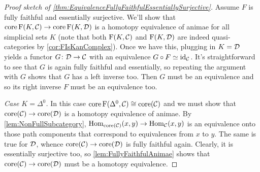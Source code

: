 \begin{proof}[Proof sketch of \cref{thm:EquivalenceFullyFaithfulEssentiallySurjective}]
	Assume $F$ is fully faithful and essentially surjective. We'll show that $\operatorname{core} \operatorname{F}(K,\mathcal{C})\rightarrow\operatorname{core}\operatorname{F}(K,\mathcal{D})$ is a homotopy equivalence of animae for all simplicial sets $K$ (note that both $\operatorname{F}(K,\mathcal{C})$ and $\operatorname{F}(K,\mathcal{D})$ are indeed quasi-categories by \cref{cor:FIsKanComplex}). Once we have this, plugging in $K=\mathcal{D}$ yields a functor $G\colon \mathcal{D}\rightarrow\mathcal{C}$ with an equivalence $G\circ F\simeq\operatorname{id}_{\mathcal{C}}$. It's straightforward to see that $G$ is again fully faithful and essentially, so repeating the argument with $G$ shows that $G$ has a left inverse too. Then $G$ must be an equivalence and so its right inverse $F$ must be an equivalence too.
	
	\emph{Case $K=\Delta^0$.} In this case $\operatorname{core} \operatorname{F}(\Delta^0,\mathcal{C})\cong \operatorname{core}(\mathcal{C})$ and we must show that $\operatorname{core}(\mathcal{C})\rightarrow\operatorname{core}(\mathcal{D})$ is a homotopy equivalence of animae. By \cref{lem:NonFullSubcategory}, $\operatorname{Hom}_{\operatorname{core} (\mathcal{C})}(x,y)\rightarrow \operatorname{Hom}_{\mathcal{C}}(x,y)$ is an equivalence onto those path components that correspond to equivalences from $x$ to $y$. The same is true for $\mathcal{D}$, whence $\operatorname{core} (\mathcal{C})\rightarrow\operatorname{core}(\mathcal{D})$ is fully faithful again. Clearly, it is essentially surjective too, so \cref{lem:FullyFaithfulAnimae} shows that $\operatorname{core} (\mathcal{C})\rightarrow\operatorname{core}(\mathcal{D})$ must be a homotopy equivalence.
	

\end{proof}
